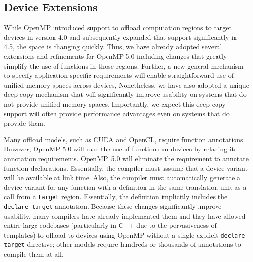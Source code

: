 \subsection{Device Extensions}
\label{sub:device_extensions}

While OpenMP introduced support to offload computation regions to target 
devices in version 4.0 and subsequently expanded that support significantly 
in 4.5, the space is changing quickly. Thus, we have already adopted several
extensions and refinements for OpenMP 5.0 including changes that greatly 
simplify the use of functions in those regions. Further, a new general 
mechanism to specify application-specific requirements will enable 
straightforward use of unified memory spaces across devices, Nonetheless, 
we have also adopted a unique deep-copy mechanism that will significantly
improve usability on systems that do not provide unified memory spaces.
Importantly, we expect this deep-copy support will often provide performance 
advantages even on systems that do provide them.

Many offload models, such as CUDA and OpenCL, require function annotations. 
However, OpenMP 5.0 will ease the use of functions on devices by relaxing 
its annotation requirements. OpenMP~5.0 will eliminate the requirement to 
annotate function declarations. Essentially, the compiler must assume that 
a device variant will be available at link time. Also, the compiler must 
automatically generate a device variant for any function with a definition 
in the same translation unit as a call from a \texttt{target} region. 
Essentially, the definition implicitly includes the \texttt{declare target} 
annotation. Because these changes significantly improve usability, many 
compilers have already implemented them and they have allowed entire large 
codebases (particularly in C++ due to the pervasiveness of templates) to 
offload to devices using OpenMP without a single explicit \texttt{declare 
target} directive; other models require hundreds or thousands of annotations 
to compile them at all.

